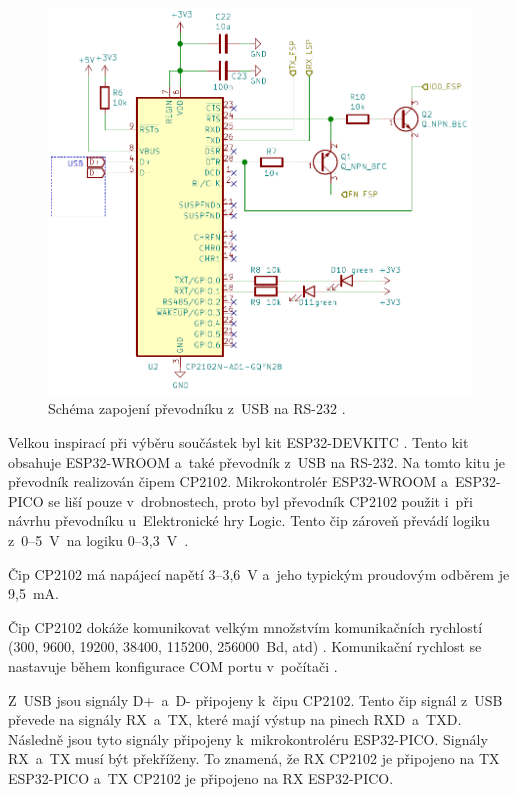   \begin{figure}[!h]
    \begin{center}
      \includegraphics[scale=0.5]{obrazky/CP2102_schema.png}
    \end{center}
    \caption[Schéma zapojení převodníku z~USB na RS-232 \cite{Devkit_schema}]{Schéma zapojení převodníku z~USB na RS-232 \cite{Devkit_schema}.}
  \end{figure}

  Velkou inspirací při výběru součástek byl kit ESP32-DEVKITC \cite{Devkit_schema}. Tento kit obsahuje ESP32-WROOM a~také převodník
  z~USB na RS-232. Na tomto kitu je převodník realizován čipem CP2102. Mikrokontrolér ESP32-WROOM a~ESP32-PICO se liší pouze v~drobnostech, 
  proto byl převodník CP2102 použit i~při návrhu převodníku u~Elektronické hry Logic.  Tento čip zároveň převádí logiku 
  z~0--5~V~na logiku 0--3,3~V~\cite{CP2102_datasheet}. 

 Čip CP2102 má napájecí napětí 3--3,6~V a~jeho typickým proudovým odběrem je 9,5~mA.

  Čip CP2102 dokáže komunikovat velkým množstvím komunikačních rychlostí (300, 9600, 19200, 38400, 115200, 256000~Bd, atd) 
  \cite{CP2102_datasheet}. Komunikační rychlost se nastavuje během konfigurace COM portu v~počítači \cite{CP2102_datasheet}.

  Z~USB jsou signály D+~a~D- připojeny k~čipu CP2102. Tento čip signál z~USB převede na signály RX~a~TX, které mají výstup 
  na pinech RXD~a~TXD. Následně jsou tyto signály připojeny k~mikrokontroléru ESP32-PICO. Signály RX~a~TX musí být překříženy. To znamená, že RX CP2102
  je připojeno na TX ESP32-PICO a~TX CP2102 je připojeno na RX ESP32-PICO. 

